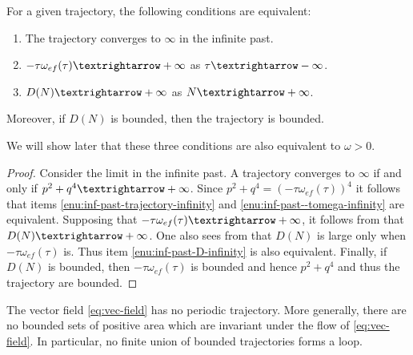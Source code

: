 \begin{lem}
\label{lem:oscillation-condition}For a given trajectory, the following conditions are equivalent:
\begin{enumerate}
\item \label{enu:inf-past-trajectory-infinity}The trajectory converges to $\bm{\infty}$ in the infinite past.
\item \label{enu:inf-past--tomega-infinity}$-\tau\omega_{ef}(\tau)\textrightarrow+\infty$ as $\tau\textrightarrow-\infty$. 
\item \label{enu:inf-past-D-infinity}$D(N)\textrightarrow+\infty$ as $N\textrightarrow+\infty$. 
\end{enumerate}
Moreover, if $D(N)$ is bounded, then the trajectory is bounded.
\end{lem}

We will show later that these three conditions are also equivalent to $\omega>0$. 
\begin{proof}
Consider the limit in the infinite past. A trajectory converges to $\bm{\infty}$ if and only if $p^{2}+q^{4}\textrightarrow+\infty$. Since $p^{2}+q^{4}=(-\tau\omega_{ef}(\tau))^{4}$ it follows that items \ref{enu:inf-past-trajectory-infinity} and \ref{enu:inf-past--tomega-infinity} are equivalent. Supposing that $-\tau\omega_{ef}(\tau)\textrightarrow+\infty$, it follows from  that $D(N)\textrightarrow+\infty$. One also sees from  that $D(N)$ is large only when $-\tau\omega_{ef}(\tau)$ is. Thus item \ref{enu:inf-past-D-infinity} is also equivalent. Finally, if $D(N)$ is bounded, then $-\tau\omega_{ef}(\tau)$ is bounded and hence $p^{2}+q^{4}$ and thus the trajectory are bounded.
\end{proof}
\begin{lem}
\label{lem:Bendixson-criterion}The vector field \eqref{eq:vec-field} has no periodic trajectory. More generally, there are no bounded sets of positive area which are invariant under the flow of \eqref{eq:vec-field}. In particular, no finite union of bounded trajectories forms a loop.
\end{lem}

